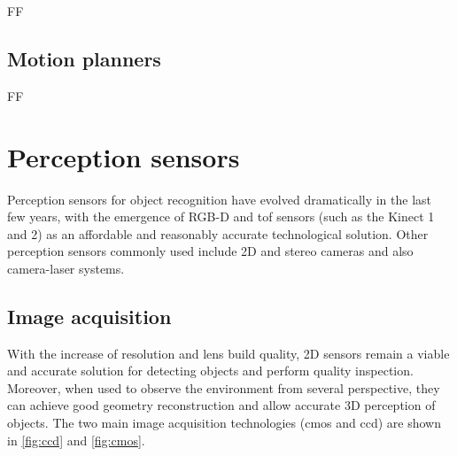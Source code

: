 FF


\subsection{Motion planners}

FF






\section{Perception sensors}

Perception sensors for object recognition have evolved dramatically in the last few years, with the emergence of RGB-D and \gls{tof} sensors (such as the Kinect 1 and 2) as an affordable and reasonably accurate technological solution. Other perception sensors commonly used include 2D and stereo cameras and also camera-laser systems.


\subsection{Image acquisition}\label{sec:image-acquisition}

With the increase of resolution and lens build quality, 2D sensors remain a viable and accurate solution for detecting objects and perform quality inspection. Moreover, when used to observe the environment from several perspective, they can achieve good geometry reconstruction and allow accurate 3D perception of objects. The two main image acquisition technologies (\gls{cmos} and \gls{ccd}) are shown in \cref{fig:ccd} and \cref{fig:cmos}.


